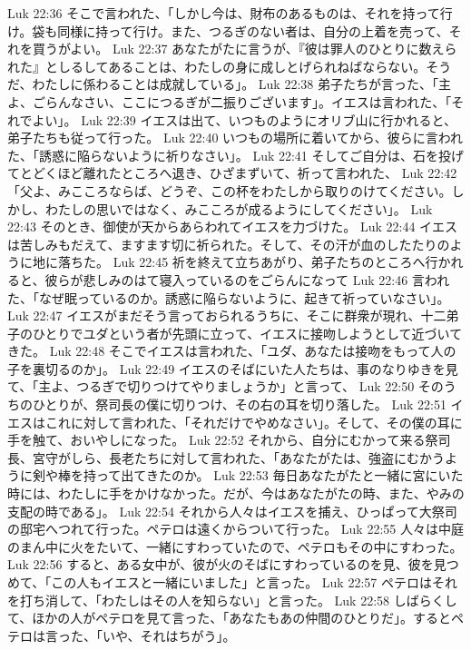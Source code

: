 Luk 22:36  そこで言われた、「しかし今は、財布のあるものは、それを持って行け。袋も同様に持って行け。また、つるぎのない者は、自分の上着を売って、それを買うがよい。
Luk 22:37  あなたがたに言うが、『彼は罪人のひとりに数えられた』としるしてあることは、わたしの身に成しとげられねばならない。そうだ、わたしに係わることは成就している」。
Luk 22:38  弟子たちが言った、「主よ、ごらんなさい、ここにつるぎが二振りございます」。イエスは言われた、「それでよい」。
Luk 22:39  イエスは出て、いつものようにオリブ山に行かれると、弟子たちも従って行った。
Luk 22:40  いつもの場所に着いてから、彼らに言われた、「誘惑に陥らないように祈りなさい」。
Luk 22:41  そしてご自分は、石を投げてとどくほど離れたところへ退き、ひざまずいて、祈って言われた、
Luk 22:42  「父よ、みこころならば、どうぞ、この杯をわたしから取りのけてください。しかし、わたしの思いではなく、みこころが成るようにしてください」。
Luk 22:43  そのとき、御使が天からあらわれてイエスを力づけた。
Luk 22:44  イエスは苦しみもだえて、ますます切に祈られた。そして、その汗が血のしたたりのように地に落ちた。
Luk 22:45  祈を終えて立ちあがり、弟子たちのところへ行かれると、彼らが悲しみのはて寝入っているのをごらんになって
Luk 22:46  言われた、「なぜ眠っているのか。誘惑に陥らないように、起きて祈っていなさい」。
Luk 22:47  イエスがまだそう言っておられるうちに、そこに群衆が現れ、十二弟子のひとりでユダという者が先頭に立って、イエスに接吻しようとして近づいてきた。
Luk 22:48  そこでイエスは言われた、「ユダ、あなたは接吻をもって人の子を裏切るのか」。
Luk 22:49  イエスのそばにいた人たちは、事のなりゆきを見て、「主よ、つるぎで切りつけてやりましょうか」と言って、
Luk 22:50  そのうちのひとりが、祭司長の僕に切りつけ、その右の耳を切り落した。
Luk 22:51  イエスはこれに対して言われた、「それだけでやめなさい」。そして、その僕の耳に手を触て、おいやしになった。
Luk 22:52  それから、自分にむかって来る祭司長、宮守がしら、長老たちに対して言われた、「あなたがたは、強盗にむかうように剣や棒を持って出てきたのか。
Luk 22:53  毎日あなたがたと一緒に宮にいた時には、わたしに手をかけなかった。だが、今はあなたがたの時、また、やみの支配の時である」。
Luk 22:54  それから人々はイエスを捕え、ひっぱって大祭司の邸宅へつれて行った。ペテロは遠くからついて行った。
Luk 22:55  人々は中庭のまん中に火をたいて、一緒にすわっていたので、ペテロもその中にすわった。
Luk 22:56  すると、ある女中が、彼が火のそばにすわっているのを見、彼を見つめて、「この人もイエスと一緒にいました」と言った。
Luk 22:57  ペテロはそれを打ち消して、「わたしはその人を知らない」と言った。
Luk 22:58  しばらくして、ほかの人がペテロを見て言った、「あなたもあの仲間のひとりだ」。するとペテロは言った、「いや、それはちがう」。
